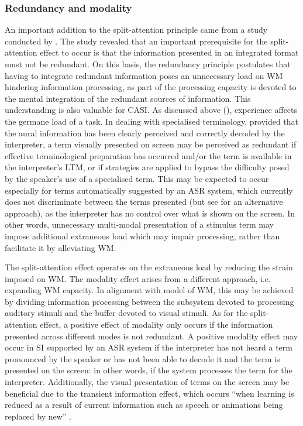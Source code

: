 \subsubsection{Redundancy and modality} \label{redundancy_modality}
An important addition to the split-attention principle came from a study conducted by \citet{chandler_cognitive_1991}. The study revealed that an important prerequisite for the split-attention effect to occur is that the information presented in an integrated format must not be redundant. On this basis, the redundancy principle postulates that having to integrate redundant information poses an unnecessary load on WM hindering information processing, as part of the processing capacity is devoted to the mental integration of the redundant sources of information. This understanding is also valuable for CASI. As discussed above (), experience affects the germane load of a task. In dealing with specialised terminology, provided that the aural information has been clearly perceived and correctly decoded by the interpreter, a term visually presented on screen may be perceived as redundant if effective terminological preparation has occurred and/or the term is available in the interpreter's LTM, or if strategies are applied to bypass the difficulty posed by the speaker's use of a specialised term. This may be expected to occur especially for terms automatically suggested by an ASR system, which currently does not discriminate between the terms presented (but see \citealt{vogler_lost_2019} for an alternative approach), as the interpreter has no control over what is shown on the screen. In other words, unnecessary multi-modal presentation of a stimulus term may impose additional extraneous load which may impair processing, rather than facilitate it by alleviating WM.

The split-attention effect operates on the extraneous load by reducing the strain imposed on WM. The modality effect arises from a different approach, i.e. expanding WM capacity. In alignment with  model of WM, this may be achieved by dividing information processing between the subsystem devoted to processing auditory stimuli and the buffer devoted to visual stimuli. As for the split-attention effect, a positive effect of modality only occurs if the information presented across different modes is not redundant. A positive modality effect may occur in SI supported by an ASR system if the interpreter has not heard a term pronounced by the speaker or has not been able to decode it and the term is presented on the screen: in other words, if the system processes the term for the interpreter. Additionally, the visual presentation of terms on the screen may be beneficial due to the transient information effect, which occurs ``when learning is reduced as a result of current information such as speech or animations being replaced by new'' \citep[242]{mayer_modality_2014}.

